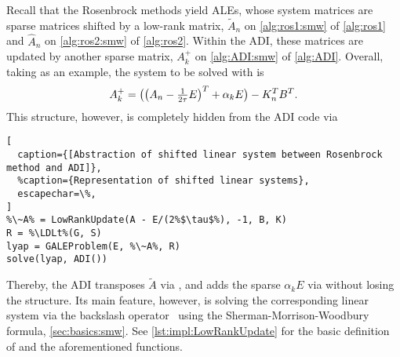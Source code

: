 Recall that the Rosenbrock methods yield \acp{ALE},
whose system matrices are sparse matrices shifted by a low-rank matrix,
\cf $\tilde A_n$ on \autoref{alg:ros1:smw} of \autoref{alg:ros1} and $\hat A_n$ on \autoref{alg:ros2:smw} of \autoref{alg:ros2}.
Within the \ac{ADI}, these matrices are updated by another sparse matrix,
\cf $A^+_k$ on \autoref{alg:ADI:smw} of \autoref{alg:ADI}.
Overall, taking  as an example,
the system to be solved with is
\begin{equation}
  A_k^+ =
  \big(\big( A_n - \tfrac{1}{2\tau} E \big)^T + \alpha_k E \big) - K_n^T B^T
  .
\end{equation}
This structure, however, is completely hidden from the \ac{ADI} code via
\begin{lstlisting}[
  caption={[Abstraction of shifted linear system between Rosenbrock method and ADI]},
  %caption={Representation of shifted linear systems},
  escapechar=\%,
]
%\~A% = LowRankUpdate(A - E/(2%$\tau$%), -1, B, K)
R = %\LDLt%(G, S)
lyap = GALEProblem(E, %\~A%, R)
solve(lyap, ADI())
\end{lstlisting}
Thereby, the \ac{ADI} transposes $\tilde A$ via ,
and adds the sparse $\alpha_k E$ via \julia{(+)} without losing the  structure.
Its main feature, however, is solving the corresponding linear system via the backslash operator~\julia{(\textbackslash)}
using the Sherman-Morrison-Woodbury formula,
\cf \autoref{sec:basics:smw}.
See \autoref{lst:impl:LowRankUpdate} for the basic definition of  and the aforementioned functions.

